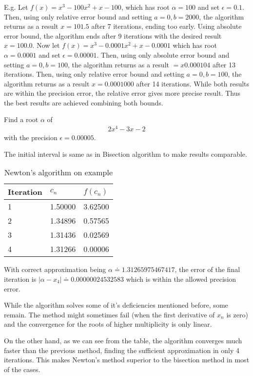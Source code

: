 \documentclass[
  digital, %
  table,   %
  nolof,     %
  nolot,     %
	draft, %
]{fithesis3}
\begin{document}
E.g. Let $f(x)=x^3-100x^2+x-100$, which has root $\alpha=100$ and set $\epsilon=0.1$. Then, using only relative error bound and setting $a=0, b=2000$, the algorithm returns as a result $x=101.5$ after 7 iterations, ending too early. Using absolute error bound, the algorithm ends after 9 iterations with the desired result $x=100.0$. 
Now let $f(x)=x^3-0.0001x^2+x-0.0001$ which has root $\alpha=0.0001$ and set $\epsilon=0.00001$. Then, using only absolute error bound and setting $a=0, b=100$, the algorithm returns as a result $=x0.000104$ after 13 iterations. Then, using only relative error bound and setting $a=0, b=100$, the algorithm returns as a result $x=0.0001000$ after 14 iterations. While both results are within the precision error, the relative error gives more precise result. Thus the best results are achieved combining both bounds.
\begin{example}
Find a root $\alpha$ of 
\begin{align}
      2x^{4} - 3x - 2
\end{align}
with the precision $\epsilon = 0.00005$.
\end{example}
The initial interval is same as in Bisection algorithm to make results comparable.
\FloatBarrier
\begin{table}[H]
  \begin{tabularx}{\textwidth}{lll}
    \toprule
    Iteration & $c_{n}$ & $f(c_{n})$\\
    \midrule
		1 & 1.50000 & 3.62500 \\
		2 & 1.34896 & 0.57565 \\
		3 & 1.31436 & 0.02569 \\
		4 & 1.31266 & 0.00006 \\
    \bottomrule
  \end{tabularx}
  \caption{Newton's algorithm on example}
  \label{tab:newt}
\end{table}

With correct approximation being $\alpha \doteq 1.31265975467417$, the error of the final iteration is $|\alpha - x_{4}|\doteq0.00000024532583$ which is within the allowed precision error.

While the algorithm solves some of it's deficiencies mentioned before, some remain. The method might sometimes fail (when the first derivative of $x_{n}$ is zero) and the convergence for the roots of higher multiplicity is only linear.

On the other hand, as we can see from the table, the algorithm converges much faster than the previous method, finding the sufficient approximation in only 4 iterations. This makes Newton's method superior to the bisection method in most of the cases.
\end{document}
